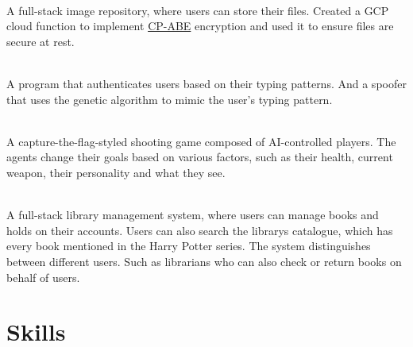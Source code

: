 \documentclass[]{resume-openfont}
\begin{document}
\hfill \\
A full-stack image repository, where users can store their files. Created a GCP cloud function to implement \href{https://www.cs.utexas.edu/~bwaters/publications/papers/cp-abe.pdf}{CP-ABE} encryption and used it to ensure files are secure at rest.\\
\sectionsep
  
\\
A program that authenticates users based on their typing patterns. And a spoofer that uses the genetic algorithm to mimic the user's typing pattern.\\
\sectionsep

\\
A capture-the-flag-styled shooting game composed of AI-controlled players. The agents change their goals based on various factors, such as their health, current weapon, their personality and what they see.\\
\sectionsep
  
\\
A full-stack library management system, where users can manage books and holds on their accounts. Users can also search the library\textquotesingle{}s catalogue, which has every book mentioned in the Harry Potter series. The system distinguishes between different users. Such as librarians who can also check or return books on behalf of users.\\
\sectionsep

\section{Skills}
\end{document}
